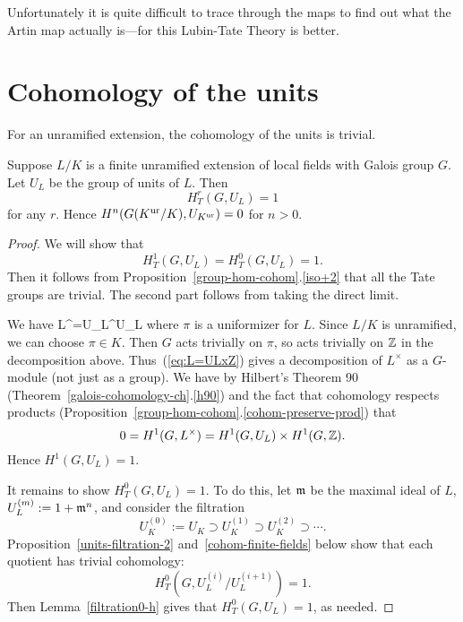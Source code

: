 Unfortunately it is quite difficult to trace through the maps to find out what the Artin map actually is---for this Lubin-Tate Theory is better. %
\section{Cohomology of the units}
For an unramified extension, the cohomology of the units is trivial.
\begin{thm}
Suppose $L/K$ is a finite unramified extension of local fields with Galois group $G$. Let $U_L$ be the group of units of $L$. Then 
\[
H_T^r(G,U_L)=1
\]
for any $r$. Hence $H^n(G(K^{\text{ur}}/K),U_{K^{\text{ur}}})=0$ for $n>0$.
\end{thm}
\begin{proof}
We will show that
\[
H_T^1(G,U_L)=H_T^0(G,U_L)=1.
\]
Then it follows from Proposition~\ref{group-hom-cohom}.\ref{iso+2} that all the Tate groups are trivial. The second part follows from taking the direct limit. %

We have
L^{\times}=U_L\times \pi^{\Z}\cong U_L\times \Z
\eeq
where $\pi$ is a uniformizer for $L$. Since $L/K$ is unramified, we can choose $\pi \in K$. Then $G$ acts trivially on $\pi$, so acts trivially on $\mathbb{Z}$ in the decomposition above. Thus~(\ref{eq:L=ULxZ}) gives a decomposition of $L^{\times}$ as a $G$-module (not just as a group). We have by Hilbert's Theorem 90 (Theorem~\ref{galois-cohomology-ch}.\ref{h90}) and the fact that cohomology respects products (Proposition~\ref{group-hom-cohom}.\ref{cohom-preserve-prod}) that
\[
0= H^1(G,L^{\times})=H^1(G,U_L)\times H^1(G,\mathbb{Z}).
\]
Hence $H^1(G,U_L)=1$.

It remains to show $H_T^0(G,U_L)=1$. To do this, let $\mathfrak{m}$ be the maximal ideal of $L$, $U_L^{(m)}:=1+\mathfrak{m}^n$, and consider the filtration
\[
U_K^{(0)}:=U_K\supset U_K^{(1)}\supset U_K^{(2)}\supset \cdots.
\]
Proposition~\ref{units-filtration-2} and~\ref{cohom-finite-fields} below show that each quotient has trivial cohomology:
\[
H_T^0(G,U_L^{(i)}/U_L^{(i+1)})=1.
\]
Then Lemma~\ref{filtration0-h} gives that $H_T^0(G,U_L)=1$, as needed.
\end{proof}
